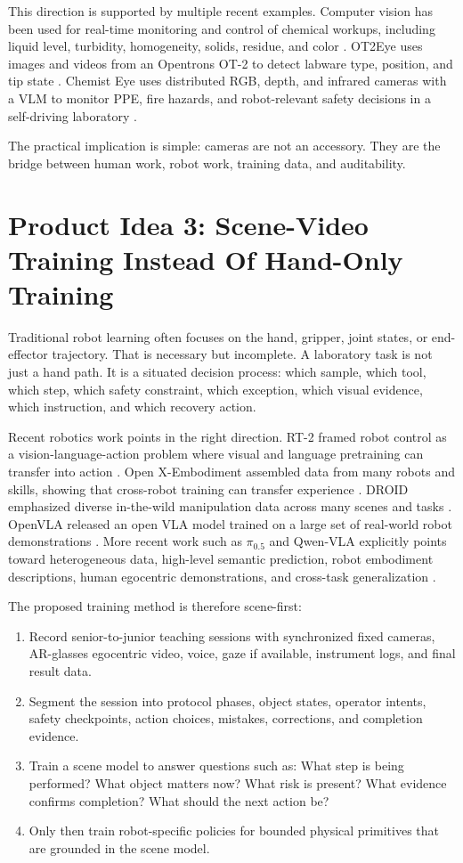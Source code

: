 \documentclass[11pt]{article}
\begin{document}
This direction is supported by multiple recent examples. Computer vision has been used for real-time monitoring and control of chemical workups, including liquid level, turbidity, homogeneity, solids, residue, and color \cite{elkhawaldeh2024eye}. OT2Eye uses images and videos from an Opentrons OT-2 to detect labware type, position, and tip state \cite{ot2eye2026}. Chemist Eye uses distributed RGB, depth, and infrared cameras with a VLM to monitor PPE, fire hazards, and robot-relevant safety decisions in a self-driving laboratory \cite{chemistEye2026}.

The practical implication is simple: cameras are not an accessory. They are the bridge between human work, robot work, training data, and auditability.

\section{Product Idea 3: Scene-Video Training Instead Of Hand-Only Training}

Traditional robot learning often focuses on the hand, gripper, joint states, or end-effector trajectory. That is necessary but incomplete. A laboratory task is not just a hand path. It is a situated decision process: which sample, which tool, which step, which safety constraint, which exception, which visual evidence, which instruction, and which recovery action.

Recent robotics work points in the right direction. RT-2 framed robot control as a vision-language-action problem where visual and language pretraining can transfer into action \cite{rt2}. Open X-Embodiment assembled data from many robots and skills, showing that cross-robot training can transfer experience \cite{openx}. DROID emphasized diverse in-the-wild manipulation data across many scenes and tasks \cite{droid}. OpenVLA released an open VLA model trained on a large set of real-world robot demonstrations \cite{openvla}. More recent work such as $\pi_{0.5}$ and Qwen-VLA explicitly points toward heterogeneous data, high-level semantic prediction, robot embodiment descriptions, human egocentric demonstrations, and cross-task generalization \cite{pi05,qwenvla}.

The proposed training method is therefore scene-first:

\begin{enumerate}
  \item Record senior-to-junior teaching sessions with synchronized fixed cameras, AR-glasses egocentric video, voice, gaze if available, instrument logs, and final result data.
  \item Segment the session into protocol phases, object states, operator intents, safety checkpoints, action choices, mistakes, corrections, and completion evidence.
  \item Train a scene model to answer questions such as: What step is being performed? What object matters now? What risk is present? What evidence confirms completion? What should the next action be?
  \item Only then train robot-specific policies for bounded physical primitives that are grounded in the scene model.
\end{enumerate}
\end{document}
